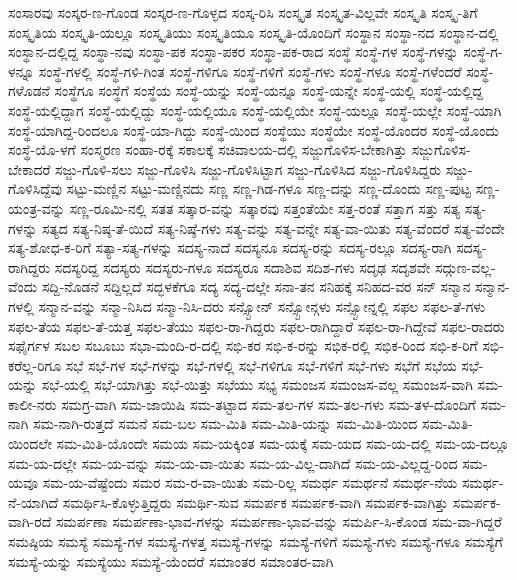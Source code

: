 {ಸಂಸಾರವು
ಸಂಸ್ಕರ-ಣ-ಗೊಂಡ
ಸಂಸ್ಕರ-ಣ-ಗೊಳ್ಳದ
ಸಂಸ್ಕ-ರಿಸಿ
ಸಂಸ್ಕೃತ
ಸಂಸ್ಕೃತ-ವಿಲ್ಲವೇ
ಸಂಸ್ಕೃತಿ
ಸಂಸ್ಕೃ-ತಿಗೆ
ಸಂಸ್ಕೃತಿಯ
ಸಂಸ್ಕೃತಿ-ಯಲ್ಲೂ
ಸಂಸ್ಕೃತಿಯು
ಸಂಸ್ಕೃತಿಯೂ
ಸಂಸ್ಕೃತಿ-ಯೊಂದಿಗೆ
ಸಂಸ್ಥಾನ
ಸಂಸ್ಥಾ-ನದ
ಸಂಸ್ಥಾನ-ದಲ್ಲಿ
ಸಂಸ್ಥಾನ-ದಲ್ಲಿದ್ದ
ಸಂಸ್ಥಾ-ನವು
ಸಂಸ್ಥಾ-ಪಕ
ಸಂಸ್ಥಾ-ಪಕರ
ಸಂಸ್ಥಾ-ಪಕ-ರಾದ
ಸಂಸ್ಥೆ
ಸಂಸ್ಥೆ-ಗಳ
ಸಂಸ್ಥೆ-ಗಳನ್ನು
ಸಂಸ್ಥೆ-ಗ-ಳನ್ನೂ
ಸಂಸ್ಥೆ-ಗಳಲ್ಲಿ
ಸಂಸ್ಥೆ-ಗಳಿ-ಗಿಂತ
ಸಂಸ್ಥೆ-ಗಳಿಗೂ
ಸಂಸ್ಥೆ-ಗಳಿಗೆ
ಸಂಸ್ಥೆ-ಗಳು
ಸಂಸ್ಥೆ-ಗಳೂ
ಸಂಸ್ಥೆ-ಗಳೆಂದರೆ
ಸಂಸ್ಥೆ-ಗಳೊಡನೆ
ಸಂಸ್ಥೆಗೂ
ಸಂಸ್ಥೆಗೆ
ಸಂಸ್ಥೆಯ
ಸಂಸ್ಥೆ-ಯನ್ನು
ಸಂಸ್ಥೆ-ಯನ್ನೂ
ಸಂಸ್ಥೆ-ಯನ್ನೇ
ಸಂಸ್ಥೆ-ಯಲ್ಲಿ
ಸಂಸ್ಥೆ-ಯಲ್ಲಿದ್ದ
ಸಂಸ್ಥೆ-ಯಲ್ಲಿದ್ದಾಗ
ಸಂಸ್ಥೆ-ಯಲ್ಲಿದ್ದು
ಸಂಸ್ಥೆ-ಯಲ್ಲಿಯೂ
ಸಂಸ್ಥೆ-ಯಲ್ಲಿಯೇ
ಸಂಸ್ಥೆ-ಯಲ್ಲೂ
ಸಂಸ್ಥೆ-ಯಲ್ಲೇ
ಸಂಸ್ಥೆ-ಯಾಗಿ
ಸಂಸ್ಥೆ-ಯಾಗಿದ್ದ-ರಿಂದಲೂ
ಸಂಸ್ಥೆ-ಯಾ-ಗಿದ್ದು
ಸಂಸ್ಥೆ-ಯಿಂದ
ಸಂಸ್ಥೆಯು
ಸಂಸ್ಥೆಯೇ
ಸಂಸ್ಥೆ-ಯೊಂದರ
ಸಂಸ್ಥೆ-ಯೊಂದು
ಸಂಸ್ಥೆ-ಯೊ-ಳಗೆ
ಸಂಸ್ಮರಣ
ಸಂಹಾ-ರಕ್ಕೆ
ಸಕಾಲಕ್ಕೆ
ಸಚಿವಾಲಯ-ದಲ್ಲಿ
ಸಜ್ಜುಗೊಳಿಸ-ಬೇಕಾಗಿತ್ತು
ಸಜ್ಜುಗೊಳಿಸ-ಬೇಕಾದರೆ
ಸಜ್ಜು-ಗೊಳಿ-ಸಲು
ಸಜ್ಜು-ಗೊಳಿಸಿ
ಸಜ್ಜು-ಗೊಳಿಸಿಟ್ಟಾಗ
ಸಜ್ಜು-ಗೊಳಿಸಿದ
ಸಜ್ಜು-ಗೊಳಿಸಿದ್ದರು
ಸಜ್ಜು-ಗೊಳಿಸಿದ್ದೆವು
ಸಟ್ಟು-ಮಣ್ಣಿನ
ಸಟ್ಟು-ಮಣ್ಣಿನದು
ಸಣ್ಣ
ಸಣ್ಣ-ಗಿಡ-ಗಳೂ
ಸಣ್ಣ-ದನ್ನು
ಸಣ್ಣ-ದೊಂದು
ಸಣ್ಣ-ಪುಟ್ಟ
ಸಣ್ಣ-ಯಂತ್ರ-ವನ್ನು
ಸಣ್ಣ-ರೂಮಿ-ನಲ್ಲಿ
ಸತತ
ಸತ್ಕಾರ-ವನ್ನು
ಸತ್ಕಾರವು
ಸತ್ತಂತೆಯೇ
ಸತ್ತ-ರಂತೆ
ಸತ್ತಾಗ
ಸತ್ತು
ಸತ್ಯ
ಸತ್ಯ-ಗಳನ್ನು
ಸತ್ಯದ
ಸತ್ಯ-ನಿಷ್ಠ-ತೆ-ಯಿದೆ
ಸತ್ಯ-ನಿಷ್ಠೆ-ಗಳು
ಸತ್ಯ-ವನ್ನು
ಸತ್ಯ-ವನ್ನೇ
ಸತ್ಯ-ವಾ-ಯಿತು
ಸತ್ಯ-ವೆಂದರೆ
ಸತ್ಯ-ವೆಂದೇ
ಸತ್ಯ-ಶೋಧ-ಕ-ರಿಗೆ
ಸತ್ಯಾ-ಸತ್ಯ-ಗಳನ್ನು
ಸದಸ್ಯ-ನಾದೆ
ಸದಸ್ಯನೂ
ಸದಸ್ಯ-ರನ್ನು
ಸದಸ್ಯ-ರಲ್ಲೂ
ಸದಸ್ಯ-ರಾಗಿ
ಸದಸ್ಯ-ರಾಗಿದ್ದರು
ಸದಸ್ಯರಿದ್ದ
ಸದಸ್ಯರು
ಸದಸ್ಯರು-ಗಳೂ
ಸದಸ್ಯರೂ
ಸದಾಶಿವ
ಸದಿಶ-ಗಳು
ಸದೃಢ
ಸದೃಶವೇ
ಸದ್ಗುಣ-ವಲ್ಲ-ವೆಂದು
ಸದ್ದಿ-ನೊಡನೆ
ಸದ್ದಿಲ್ಲದೆ
ಸದ್ಭಳಕೆಗೂ
ಸದ್ಯ
ಸದ್ಯ-ದಲ್ಲೇ
ಸನಾ-ತನ
ಸನಿಹಕ್ಕೆ
ಸನಿಹದ-ವರ
ಸನ್
ಸನ್ಮಾನ
ಸನ್ಮಾನ-ಗಳಲ್ಲಿ
ಸನ್ಮಾನ-ವನ್ನು
ಸನ್ಮಾ-ನಿಸಿದ
ಸನ್ಮಾ-ನಿಸಿ-ದರು
ಸನ್ಸ್ಟೋನ್
ಸನ್ಸ್ಟೋನ್ಗಳು
ಸನ್ಸ್ಟೋನ್ನಲ್ಲಿ
ಸಫಲ
ಸಫಲ-ತೆ-ಗಳು
ಸಫಲ-ತೆಯ
ಸಫಲ-ತೆ-ಯತ್ತ
ಸಫಲ-ತೆಯು
ಸಫಲ-ರಾ-ಗಿದ್ದರು
ಸಫಲ-ರಾಗಿದ್ದಾರೆ
ಸಫಲ-ರಾ-ಗಿದ್ದೇವೆ
ಸಫಲ-ರಾದರು
ಸಫೈರ್ಗಳ
ಸಬಲ
ಸಬೂಬು
ಸಭಾ-ಮಂದಿ-ರ-ದಲ್ಲಿ
ಸಭಿ-ಕರ
ಸಭಿ-ಕ-ರನ್ನು
ಸಭಿಕ-ರಲ್ಲಿ
ಸಭಿಕ-ರಿಂದ
ಸಭಿ-ಕ-ರಿಗೆ
ಸಭಿ-ಕರೆಲ್ಲ-ರಿಗೂ
ಸಭೆ
ಸಭೆ-ಗಳ
ಸಭೆ-ಗಳನ್ನು
ಸಭೆ-ಗಳಲ್ಲಿ
ಸಭೆ-ಗಳಿಗೂ
ಸಭೆ-ಗಳಿಗೆ
ಸಭೆ-ಗಳು
ಸಭೆಗೆ
ಸಭೆಯ
ಸಭೆ-ಯನ್ನು
ಸಭೆ-ಯಲ್ಲಿ
ಸಭೆ-ಯಾಗಿತ್ತು
ಸಭೆ-ಯಿತ್ತು
ಸಭೆಯು
ಸಭ್ಯ
ಸಮಂಜಸ
ಸಮಂಜಸ-ವಲ್ಲ
ಸಮಂಜಸ-ವಾಗಿ
ಸಮ-ಕಾಲೀ-ನರು
ಸಮಗ್ರ-ವಾಗಿ
ಸಮ-ಜಾಯಿಷಿ
ಸಮ-ತಟ್ಟಾದ
ಸಮ-ತಲ-ಗಳ
ಸಮ-ತಲ-ಗಳು
ಸಮ-ತಳ-ದೊಂದಿಗೆ
ಸಮ-ನಾಗಿ
ಸಮ-ನಾಗಿ-ರುತ್ತದೆ
ಸಮನೆ
ಸಮ-ಬಲ
ಸಮ-ಮಿತಿ
ಸಮ-ಮಿತಿ-ಯನ್ನು
ಸಮ-ಮಿತಿ-ಯಿಂದ
ಸಮ-ಮಿತಿ-ಯಿಂದಲೇ
ಸಮ-ಮಿತಿ-ಯೊಂದೇ
ಸಮಯ
ಸಮ-ಯಕ್ಕಿಂತ
ಸಮ-ಯಕ್ಕೆ
ಸಮ-ಯದ
ಸಮ-ಯ-ದಲ್ಲಿ
ಸಮ-ಯ-ದಲ್ಲೂ
ಸಮ-ಯ-ದಲ್ಲೇ
ಸಮ-ಯ-ವನ್ನು
ಸಮ-ಯ-ವಾ-ಯಿತು
ಸಮ-ಯ-ವಿಲ್ಲ-ದಾಗಿದೆ
ಸಮ-ಯ-ವಿಲ್ಲದ್ದ-ರಿಂದ
ಸಮ-ಯವೂ
ಸಮ-ಯ-ವೆಷ್ಟೆಂದು
ಸಮರ
ಸಮ-ರ-ವಾ-ಯಿತು
ಸಮ-ರಿಲ್ಲ
ಸಮರ್ಥ
ಸಮರ್ಥನೆ
ಸಮರ್ಥ-ನೆಯ
ಸಮರ್ಥ-ನೆ-ಯಾಗಿದೆ
ಸಮರ್ಥಿಸಿ-ಕೊಳ್ಳುತ್ತಿದ್ದರು
ಸಮರ್ಥಿ-ಸುವ
ಸಮರ್ಪಕ
ಸಮರ್ಪಕ-ವಾಗಿ
ಸಮರ್ಪಕ-ವಾಗಿತ್ತು
ಸಮರ್ಪಕ-ವಾಗಿ-ರದೆ
ಸಮರ್ಪಣಾ
ಸಮರ್ಪಣಾ-ಭಾವ-ಗಳನ್ನು
ಸಮರ್ಪಣಾ-ಭಾವ-ವನ್ನು
ಸಮರ್ಪಿ-ಸಿ-ಕೊಂಡ
ಸಮ-ವಾ-ಗಿದ್ದರೆ
ಸಮಷ್ಠಿಯ
ಸಮಸ್ಯೆ
ಸಮಸ್ಯೆ-ಗಳ
ಸಮಸ್ಯೆ-ಗಳತ್ತ
ಸಮಸ್ಯೆ-ಗಳನ್ನು
ಸಮಸ್ಯೆ-ಗಳಿಗೆ
ಸಮಸ್ಯೆ-ಗಳು
ಸಮಸ್ಯೆ-ಗಳೂ
ಸಮಸ್ಯೆಗೆ
ಸಮಸ್ಯೆ-ಯನ್ನು
ಸಮಸ್ಯೆಯು
ಸಮಸ್ಯೆ-ಯೆಂದರೆ
ಸಮಾಂತರ
ಸಮಾಂತರ-ವಾಗಿ
}
